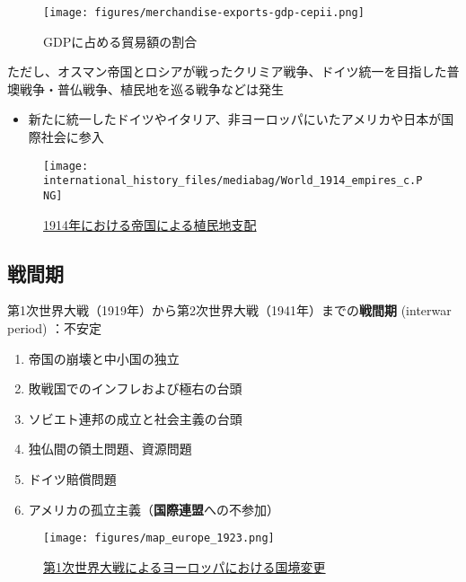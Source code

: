 \documentclass[
  xelatex,
  ja=standard]{bxjsarticle}
\providecommand{\tightlist}{%
  \setlength{\itemsep}{0pt}\setlength{\parskip}{0pt}}\usepackage{longtable,booktabs,array}
\begin{document}
\begin{figure}[htpb]

{\centering \texttt{[image: figures/merchandise-exports-gdp-cepii.png]}

}

\caption{GDPに占める貿易額の割合}

\end{figure}

ただし、オスマン帝国とロシアが戦ったクリミア戦争、ドイツ統一を目指した普墺戦争・普仏戦争、植民地を巡る戦争などは発生

\begin{itemize}
\tightlist
\item
  新たに統一したドイツやイタリア、非ヨーロッパにいたアメリカや日本が国際社会に参入
\end{itemize}

\begin{figure}[htpb]

{\centering \texttt{[image: international\_history\_files/mediabag/World\_1914\_empires\_c.PNG]}

}

\caption{\href{https://commons.wikimedia.org/wiki/File:World_1914_empires_colonies_territory.PNG}{1914年における帝国による植民地支配}}

\end{figure}

\hypertarget{ux6226ux9593ux671f}{%
\subsection{戦間期}\label{ux6226ux9593ux671f}}

第1次世界大戦（1919年）から第2次世界大戦（1941年）までの\textbf{戦間期}
(interwar period) ：不安定

\begin{enumerate}
\def\labelenumi{\arabic{enumi}.}
\tightlist
\item
  帝国の崩壊と中小国の独立
\item
  敗戦国でのインフレおよび極右の台頭
\item
  ソビエト連邦の成立と社会主義の台頭
\item
  独仏間の領土問題、資源問題
\item
  ドイツ賠償問題
\item
  アメリカの孤立主義（\textbf{国際連盟}への不参加）
\end{enumerate}

\begin{figure}[htpb]

{\centering \texttt{[image: figures/map\_europe\_1923.png]}

}

\caption{\href{https://commons.wikimedia.org/wiki/File:Map_Europe_1923-en.svg}{第1次世界大戦によるヨーロッパにおける国境変更}}

\end{figure}
\end{document}
